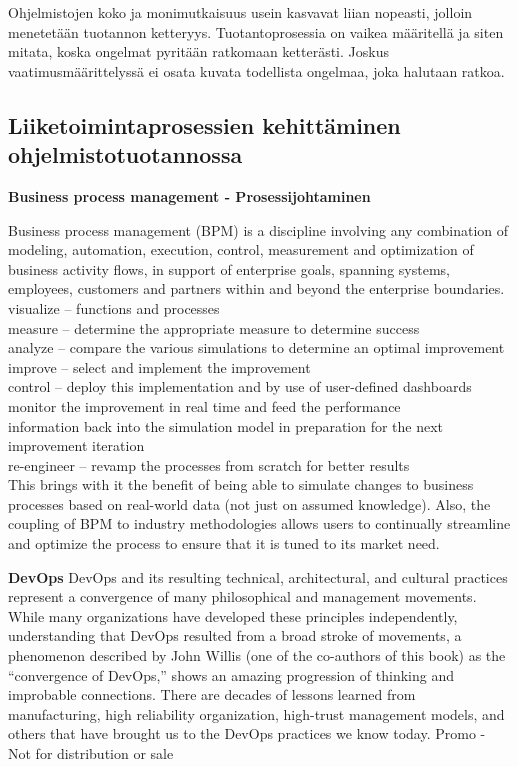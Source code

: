 \documentclass[finnish,12pt,a4paper,pdftex]{article}
\begin{document}
Ohjelmistojen koko ja monimutkaisuus usein kasvavat liian nopeasti, jolloin menetetään tuotannon ketteryys. Tuotantoprosessia on vaikea määritellä ja siten mitata, koska ongelmat pyritään ratkomaan ketterästi. Joskus vaatimusmäärittelyssä ei osata kuvata todellista ongelmaa, joka halutaan ratkoa. 

\subsection{Liiketoimintaprosessien kehittäminen ohjelmistotuotannossa}

\textbf{Business process management - Prosessijohtaminen}

\cite{gandhi}
Business process management (BPM) is a discipline involving any combination of modeling, automation, execution, control, measurement and optimization of business activity flows, in support of enterprise goals, spanning systems, employees, customers and partners within and beyond the enterprise boundaries.\\

visualize – functions and processes\\
measure – determine the appropriate measure to determine success\\
analyze – compare the various simulations to determine an optimal improvement\\
improve – select and implement the improvement\\
control – deploy this implementation and by use of user-defined dashboards monitor the improvement in real time and feed the performance\\ information back into the simulation model in preparation for the next improvement iteration\\
re-engineer – revamp the processes from scratch for better results\\
This brings with it the benefit of being able to simulate changes to business processes based on real-world data (not just on assumed knowledge). Also, the coupling of BPM to industry methodologies allows users to continually streamline and optimize the process to ensure that it is tuned to its market need.

\textbf{DevOps}
\cite{devops}
DevOps and its resulting technical, architectural, and cultural practices represent
a convergence of many philosophical and management movements.
While many organizations have developed these principles independently,
understanding that DevOps resulted from a broad stroke of movements, a
phenomenon described by John Willis (one of the co-authors of this book) as
the “convergence of DevOps,” shows an amazing progression of thinking and
improbable connections. There are decades of lessons learned from manufacturing,
high reliability organization, high-trust management models, and
others that have brought us to the DevOps practices we know today.
Promo - Not for distribution or sale
\end{document}

